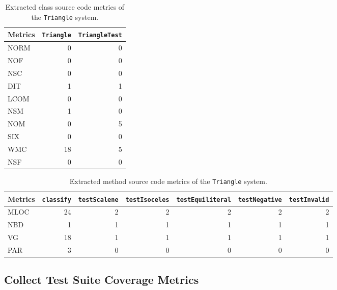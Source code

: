 \begin{landscape}
  \begin{table}[h]
    \centering
    \begin{tabular}{|l|r|r|}
      \hline
      \rowcolor[RGB]{169,196,223}
      \textbf{Metrics} & \texttt{\textbf{Triangle}} & \texttt{\textbf{TriangleTest}} \\
      \hline NORM & 0 & 0 \\
      \hline NOF & 0 & 0 \\
      \hline NSC & 0 & 0 \\
      \hline DIT & 1 & 1 \\
      \hline LCOM & 0 & 0 \\
      \hline NSM & 1 & 0 \\
      \hline NOM & 0 & 5 \\
      \hline SIX & 0 & 0 \\
      \hline WMC & 18 & 5 \\
      \hline NSF & 0 & 0 \\
      \hline
    \end{tabular}
    \caption{Extracted class source code metrics of the \texttt{Triangle} system.}
    \label{tab:triangle_class_extracted_metrics}
  \end{table}

  \begin{table}[h]
    \centering
    \begin{tabular}{|l|r|r|r|r|r|r|}
      \hline
      \rowcolor[RGB]{169,196,223}
      \textbf{Metrics} & \texttt{\textbf{classify}} & \texttt{\textbf{testScalene}} & \texttt{\textbf{testIsoceles}} & \texttt{\textbf{testEquiliteral}} & \texttt{\textbf{testNegative}} & \texttt{\textbf{testInvalid}} \\
      \hline MLOC & 24 & 2 & 2 & 2 & 2 & 2 \\
      \hline NBD & 1 & 1 & 1 & 1 & 1 & 1 \\
      \hline VG & 18 & 1 & 1 & 1 & 1 & 1 \\
      \hline PAR & 3 & 0 & 0 & 0 & 0 & 0 \\
      \hline
    \end{tabular}
    \caption{Extracted method source code metrics of the \texttt{Triangle} system.}
    \label{tab:triangle_method_extracted_metrics}
  \end{table}
\end{landscape}


\subsection{Collect Test Suite Coverage Metrics}
\label{subsec:appraoch_collect_coverage_metrics}


